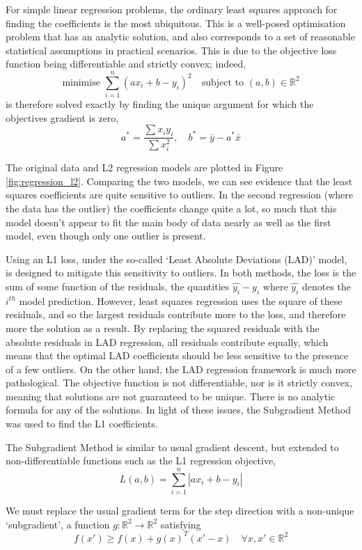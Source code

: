 \documentclass[12pt]{article}
\begin{document}
For simple linear regression problems, the ordinary least squares approach for finding the coefficients is the most ubiquitous.
This is a well-posed optimisation problem that has an analytic solution, and also corresponds to a set of reasonable statistical assumptions in practical scenarios.
This is due to the objective loss function being differentiable and strictly convex; indeed,
\[\text{minimise } \sum_{i=1}^{n}{(ax_i+b-y_i)^2} \quad \text{subject to } (a, b)\in\mathbb{R}^2\]
is therefore solved exactly by finding the unique argument for which the objectives gradient is zero,
\[a^*=\frac{\sum x_i y_i}{\sum x_i^2},\quad b^*=\bar{y} - a^*\bar{x}\]

The original data and L2 regression models are plotted in Figure \ref{fig:regression_l2}.
Comparing the two models, we can see evidence that the least squares coefficients are quite sensitive to outliers.
In the second regression (where the data has the outlier) the coefficients change quite a lot,
so much that this model doesn't appear to fit the main body of data nearly as well as the first model,
even though only one outlier is present.

Using an L1 loss, under the so-called `Least Absolute Deviations (LAD)' model,
is designed to mitigate this sensitivity to outliers.
In both methods, the loss is the sum of some function of the residuals, the quantities $\hat{y_i} - y_i$ where $\hat{y_i}$ denotes the $i^{th}$ model prediction.
However, least squares regression uses the square of these residuals, and so the largest residuals contribute more to the loss,
and therefore more the solution as a result.
By replacing the squared residuals with the absolute residuals in LAD regression, all residuals contribute equally,
which means that the optimal LAD coefficients should be less sensitive to the presence of a few outliers.
On the other hand, the LAD regression framework is much more pathological.
The objective function is not differentiable, nor is it strictly convex, meaning that solutions are not guaranteed to be unique.
There is no analytic formula for any of the solutions.
In light of these issues, the Subgradient Method was used to find the L1 coefficients.

The Subgradient Method is similar to usual gradient descent, but extended to non-differentiable functions such as the L1 regression objective,
\[L(a,b) = \sum_{i=1}^{n}{|ax_i + b - y_i|}\]

We must replace the usual gradient term for the step direction with a non-unique `subgradient', a function $g:\mathbb{R}^2\rightarrow\mathbb{R}^2$ satisfying
\[f(x')\geq f(x) + g(x)^T(x'-x) \quad \forall x, x' \in\mathbb{R}^2\]
\end{document}
